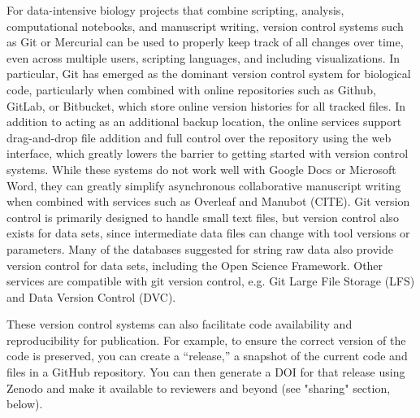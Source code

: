 \documentclass[10pt,letterpaper]{article}
\begin{document}
For data-intensive biology projects that combine scripting, analysis, computational notebooks, and manuscript writing, version control systems such as Git or Mercurial can be used to properly keep track of all changes over time, even across multiple users, scripting languages, and including visualizations. In particular, Git has emerged as the dominant version control system for biological code, particularly when combined with online repositories such as Github, GitLab, or Bitbucket, which store online version histories for all tracked files. In addition to acting as an additional backup location, the online services support drag-and-drop file addition and full control over the repository using the web interface, which greatly lowers the barrier to getting started with version control systems. While these systems do not work well with Google Docs or Microsoft Word, they can greatly simplify asynchronous collaborative manuscript writing when combined with services such as Overleaf and Manubot (CITE). Git version control is primarily designed to handle small text files, but version control also exists for data sets, since intermediate data files can change with tool versions or parameters. Many of the databases suggested for string raw data also provide version control for data sets, including the Open Science Framework. Other services are compatible with git version control, e.g. Git Large File Storage (LFS) and Data Version Control (DVC).

These version control systems can also facilitate code availability and reproducibility for publication. For example, to ensure the correct version of the code is preserved, you can create a “release,” a snapshot of the current code and files in a GitHub repository. You can then generate a DOI for that release using Zenodo and make it available to reviewers and beyond (see "sharing" section, below).


\end{document}
